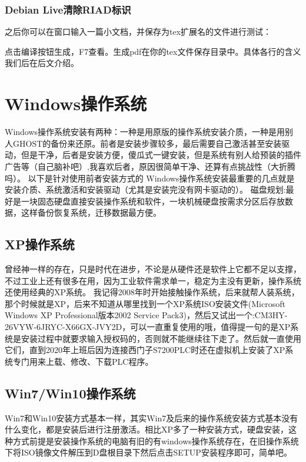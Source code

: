 \subsubsection{Debian Live清除RIAD标识}
之后你可以在窗口输入一篇小文档，并保存为tex扩展名的文件进行测试：
点击编译按钮生成，F7查看。生成pdf在你的tex文件保存目录中。具体各行的含义我们后在后文介绍。

\section{Windows操作系统}
Windows操作系统安装有两种：一种是用原版的操作系统安装介质，一种是用别人GHOST的备份来还原。前者是安装步骤较多，最后需要自己激活甚至安装驱动，但是干净，后者是安装方便，傻瓜式一键安装，但是系统有别人给预装的插件广告等（自己脑补吧）,我喜欢后者，原因很简单干净、还算有点挑战性（大折腾吗）。
以下是针对使用前者安装方式的
Windows操作系统安装最重要的几点就是安装介质、系统激活和安装驱动（尤其是安装完没有网卡驱动的）。
磁盘规划:最好是一块固态硬盘直接安装操作系统和软件，一块机械硬盘按需求分区后存放数据，这样备份恢复系统，迁移数据最方便。
\subsection{XP操作系统}
曾经神一样的存在，只是时代在进步，不论是从硬件还是软件上它都不足以支撑，不过工业上还有很多在用，因为工业软件需求单一，稳定为主没有更新，操作系统还使用经典的XP系统。
我记得2008年时开始接触操作系统，后来就帮人装系统，那个时候就是XP，后来不知道从哪里找到一个XP系统ISO安装文件(Microsoft Windows XP Professional版本2002 Service Pack3)，然后又试出一个:CM3HY-26VYW-6JRYC-X66GX-JVY2D，可以一直重复使用的哦，值得提一句的是XP系统是安装过程中就要求输入授权码的，否则就不能继续往下走了。然后就一直使用它们，直到2020年上班后因为连接西门子S7200PLC时还在虚拟机上安装了XP系统专门用来上载、修改、下载PLC程序。
\subsection{Win7/Win10操作系统}
Win7和Win10安装方式基本一样，其实Win7及后来的操作系统安装方式基本没有什么变化，都是安装后进行注册激活。相比XP多了一种安装方式，硬盘安装，这种方式前提是安装操作系统的电脑有旧的有windows操作系统存在，在旧操作系统下将ISO镜像文件解压到D盘根目录下然后点击SETUP安装程序即可，简单吧。


